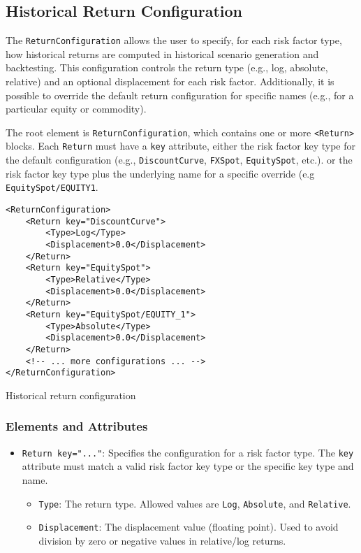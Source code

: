 \subsection{Historical Return Configuration} \label{sec:historicalreturnconfiguration}

The \lstinline|ReturnConfiguration| allows the user to specify, for each risk factor type, how historical returns are computed in historical scenario generation and backtesting. This configuration controls the return type (e.g., log, absolute, relative) and an optional displacement for each risk factor. Additionally, it is possible to override the default return configuration for specific names (e.g., for a particular equity or commodity).

The root element is \lstinline|ReturnConfiguration|, which contains one or more 
\lstinline|<Return>| blocks. Each \lstinline|Return| must have a
 \lstinline|key| attribute, either the risk factor key type for the default configuration (e.g., \texttt{DiscountCurve}, \texttt{FXSpot}, \texttt{EquitySpot}, etc.). or the risk factor key type plus the underlying name for a specific override (e.g \texttt{EquitySpot/EQUITY1}.

\begin{listing}
\begin{verbatim}
<ReturnConfiguration>
    <Return key="DiscountCurve">
        <Type>Log</Type>
        <Displacement>0.0</Displacement>
    </Return>
    <Return key="EquitySpot">
        <Type>Relative</Type>
        <Displacement>0.0</Displacement>
    </Return>
    <Return key="EquitySpot/EQUITY_1">
        <Type>Absolute</Type>
        <Displacement>0.0</Displacement>
    </Return>
    <!-- ... more configurations ... -->    
</ReturnConfiguration>
\end{verbatim}
\caption{Historical return configuration}
\label{lst:historical_return_configuration}
\end{listing}

\subsubsection*{Elements and Attributes}

\begin{itemize}
    \item \lstinline|Return key="..."|: Specifies the configuration for a risk factor type. The \lstinline|key| attribute must match a valid risk factor key type or the specific key type and name.
    \begin{itemize}
        \item \lstinline|Type|: The return type. Allowed values are \texttt{Log}, \texttt{Absolute}, and \texttt{Relative}.
        \item \lstinline|Displacement|: The displacement value (floating point). Used to avoid division by zero or negative values in relative/log returns.
    \end{itemize}
\end{itemize}

